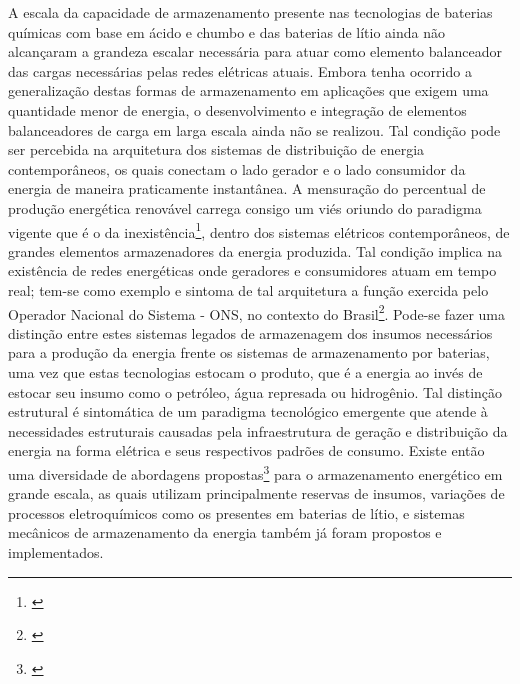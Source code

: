 \documentclass[
   article,       %
   12pt,          %
   oneside,       %
   a4paper,       %
   english,       %
   brazil,           %
   sumario=tradicional
   ]{abntex2}
\begin{document}
A escala da capacidade de armazenamento presente nas tecnologias de baterias químicas com base em ácido e chumbo e das baterias de lítio ainda não alcançaram a grandeza escalar necessária para atuar como elemento balanceador das cargas necessárias pelas redes elétricas atuais. Embora tenha ocorrido a generalização destas formas de armazenamento em aplicações que exigem uma quantidade menor de energia, o desenvolvimento e integração de elementos balanceadores de carga em larga escala ainda não se realizou. Tal condição pode ser percebida na arquitetura dos sistemas de distribuição de energia contemporâneos, os quais conectam o lado gerador e o lado consumidor da energia de maneira praticamente instantânea.
A mensuração do percentual de produção energética renovável carrega consigo um viés oriundo do paradigma vigente que é o da inexistência\footnote{\cite{OECD_IEA_2012}}, dentro dos sistemas elétricos contemporâneos, de grandes elementos armazenadores da energia produzida. Tal condição implica na existência de redes energéticas onde geradores e consumidores atuam em tempo real; tem-se como exemplo e sintoma de tal arquitetura a função exercida pelo Operador Nacional do Sistema - ONS, no contexto do Brasil\footnote{\cite{Servicos_Ancilares}}.
Pode-se fazer uma distinção entre estes sistemas legados de armazenagem dos insumos necessários para a produção da energia frente os sistemas de armazenamento por baterias, uma vez que estas tecnologias estocam o produto, que é a energia ao invés de estocar seu insumo como o petróleo, água represada ou hidrogênio. Tal distinção estrutural é sintomática de um paradigma tecnológico emergente que atende à necessidades estruturais causadas pela infraestrutura de geração e distribuição da energia na forma elétrica e seus respectivos padrões de consumo. Existe então uma diversidade de abordagens propostas\footnote{\cite{Energetic_evaluation}} para o armazenamento energético em grande escala, as quais utilizam principalmente reservas de insumos, variações de processos eletroquímicos como os presentes em baterias de lítio, e sistemas mecânicos de armazenamento da energia também já foram propostos e implementados.
\end{document}
